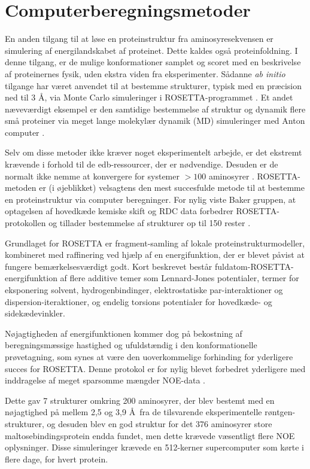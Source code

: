 \section*{Computerberegningsmetoder}
En anden tilgang til at løse en proteinstruktur fra aminosyresekvensen er simulering
af energilandskabet af proteinet. Dette kaldes også proteinfoldning. I denne
tilgang, er de mulige konformationer samplet og scoret med en beskrivelse af proteinernes fysik, uden ekstra viden fra eksperimenter. Sådanne \textit{ab initio} tilgange har været anvendet til at bestemme strukturer, typisk med en præcision ned til 3 \AA, via Monte Carlo simuleringer i ROSETTA-programmet \cite{rosetta}. Et andet næveværdigt eksempel er den samtidige bestemmelse af struktur
og dynamik flere små proteiner via meget lange molekylær dynamik (MD) simuleringer med
Anton computer \cite{rdcensemble}.

Selv om disse metoder ikke kræver noget eksperimentelt arbejde, er det ekstremt krævende i
forhold til de edb-ressourcer, der er nødvendige. Desuden er de normalt ikke nemme at konvergere for systemer $>100$ aminosyrer \cite{Lange2012}.
ROSETTA-metoden er (i øjeblikket) velsagtens den mest succesfulde metode til at bestemme
en proteinstruktur via computer beregninger. For nylig viste Baker gruppen, at optagelsen af hovedkæde kemiske skift og RDC data forbedrer ROSETTA-protokollen og tillader bestemmelse af strukturer op til 150 rester \cite{Baker2010,Lange2012}. 

Grundlaget for ROSETTA er fragment-samling af lokale proteinstrukturmodeller, kombineret med raffinering ved hjælp af en energifunktion, der er blevet påvist at fungere bemærkelsesværdigt godt. 
Kort beskrevet  består fuldatom-ROSETTA-energifunktion af flere additive temer som Lennard-Jones potentialer, termer for eksponering solvent, hydrogenbindinger, elektrostatiske par-interaktioner og dispersion-iteraktioner, og endelig torsions potentialer for hovedkæde- og sidekædevinkler. 

Nøjagtigheden af energifunktionen kommer dog på bekostning af beregningsmæssige hastighed og ufuldstændig i den konformationelle prøvetagning, som synes at være den uoverkommelige forhinding for yderligere succes for ROSETTA.
Denne protokol er for nylig blevet forbedret yderligere med inddragelse af meget sparsomme mængder NOE-data \cite{LangePNAS2012}.

Dette gav 7 strukturer omkring 200 aminosyrer, der blev bestemt med en nøjagtighed på mellem 2,5 og 3,9 \AA~fra de tilsvarende eksperimentelle røntgen-strukturer, og desuden blev en god struktur for det 376 aminosyrer store maltosebindingsprotein endda fundet, men dette krævede væsentligt flere NOE oplysninger. Disse simuleringer krævede en 512-kerner supercomputer som kørte i flere dage, for hvert protein.


